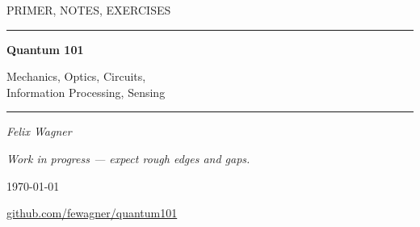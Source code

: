 \documentclass[11pt,a4paper]{book}
\begin{document}
\frontmatter

\begin{titlepage}
  \thispagestyle{empty}
  \centering
  \sffamily
  \vspace*{0.16\textheight}

  {\large\color{primary!75}\MakeUppercase{Primer, Notes, Exercises}\par}
  \vspace{1.4em}

  {\color{primary}\rule{0.55\textwidth}{1.4pt}}\par
  \vspace{2.2em}

  {\bfseries\color{primary}\fontsize{56}{60}\selectfont
   Quantum 101\par}
  \vspace{1.6em}

  {\Large\color{primary!70}
   Mechanics, Optics, Circuits,\\[0.25em]
   Information Processing, Sensing\par}

  \vspace{2.2em}
  {\color{primary}\rule{0.55\textwidth}{1.4pt}}\par

  \vspace{2.6em}

  {\Large\color{primary!85}\itshape Felix Wagner\par}

  \vfill

  {\small\color{accent}\itshape
   Work in progress --- expect rough edges and gaps.\par}
  \vspace{1.4em}

  {\large\color{primary!60}\today\par}
  \vspace{0.4em}
  {\small\color{primary!55}\texttt{\docversion}\par}
  \vspace{0.8em}
  {\small\color{primary!50}
   \href{https://github.com/fewagner/quantum101}{github.com/fewagner/quantum101}\par}
  \vspace{1.5em}
\end{titlepage}


\end{document}
